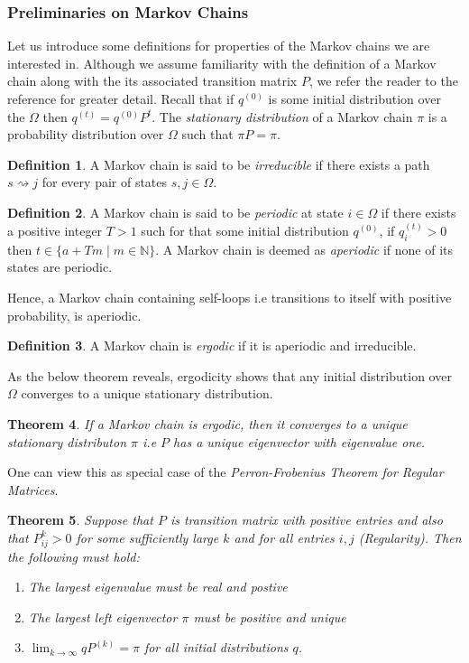 \documentclass[12pt]{amsart}
\newtheorem{theorem}{Theorem}[section]
\theoremstyle{definition}
\newtheorem{definition}[theorem]{Definition}
\theoremstyle{remark}
\numberwithin{equation}{section}
\theoremstyle{remark}
\begin{document}
\subsubsection{Preliminaries on Markov Chains}
Let us introduce some definitions for properties of the Markov chains we are interested in. Although we assume familiarity with the definition of a Markov chain along with the its associated transition matrix $P$, we refer the reader to the reference \cite{cover} for greater detail. Recall that if $q^{(0)}$ is some initial  distribution over the $\Omega$ then $q^{(t)} = q^{(0)}P^t$. The \emph{stationary distribution} of a Markov chain $\pi$ is a probability distribution over $\Omega$ such that $\pi P = \pi$.
%
\begin{definition}
  A Markov chain is said to be \emph{irreducible} if there exists a path $s \rightsquigarrow j$ for every pair of states $s,j \in \Omega$.
\end{definition}
%
\begin{definition}
  A Markov chain is said to be \emph{periodic} at state $i \in \Omega$ if there exists a positive integer $T > 1$ such for that some initial distribution $q^(0)$, if $q_i^{(t)} > 0$ then $t \in \{a + Tm \mid m \in \mathbb{N}\}$. A Markov chain is deemed as \emph{aperiodic} if none of its states are periodic.
\end{definition}
\noindent Hence, a Markov chain containing self-loops i.e transitions to itself with positive probability, is aperiodic.
%
\begin{definition}
  A Markov chain is \emph{ergodic} if it is aperiodic and irreducible.
\end{definition}
\noindent As the below theorem reveals, ergodicity shows that any initial distribution over $\Omega$ converges to a unique stationary distribution.
%
\begin{theorem}
  If a Markov chain is ergodic, then it converges to a unique stationary distributon $\pi$ i.e $P$ has a unique eigenvector with eigenvalue one.
\end{theorem}
%
\noindent One can view this as special case of the \emph{Perron-Frobenius Theorem for Regular Matrices}.
%
\begin{theorem} \label{perron}
  Suppose that $P$ is transition matrix with positive entries and also that $P_{ij}^{k} > 0$ for some sufficiently large $k$ and for all entries $i,j$ (Regularity). Then the following must hold:
  \begin{enumerate}
    \item The largest eigenvalue must be real and postive
    \item The largest left eigenvector $\pi$ must be positive and unique
    \item $\lim_{k \rightarrow \infty} qP^{(k)} = \pi$ for all initial distributions $q$.
  \end{enumerate}
\end{theorem}
\end{document}
